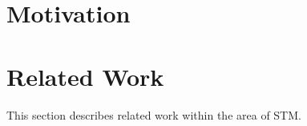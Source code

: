 \makeatletter {}\makeatother
{}
\section{Motivation}




\section{Related Work}
This section describes related work within the area of \ac{STM}. 
\worksheetend
